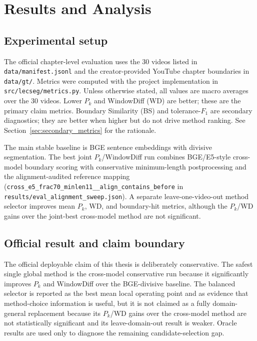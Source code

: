 \chapter{Results and Analysis}
\label{chap:results}

\section{Experimental setup}
\label{sec:setup}

The official chapter-level evaluation uses the 30 videos listed in
\texttt{data/manifest.jsonl} and the creator-provided YouTube chapter
boundaries in \texttt{data/gt/}. Metrics were computed with the project
implementation in \texttt{src/lecseg/metrics.py}. Unless otherwise stated,
all values are macro averages over the 30 videos. Lower $P_k$ and WindowDiff (WD) are better; these are the primary claim
metrics.
Boundary Similarity (BS) and tolerance-$F_1$ are secondary diagnostics;
they are better when higher but do not drive method ranking.
See Section~\ref{sec:secondary_metrics} for the rationale.

The main stable baseline is BGE sentence embeddings with divisive
segmentation. The best joint $P_k$/WindowDiff run combines BGE/E5-style
cross-model boundary scoring with conservative minimum-length postprocessing
and the alignment-audited reference mapping
(\texttt{cross\_e5\_frac70\_minlen11\_\_align\_contains\_before} in
\texttt{results/eval\_alignment\_sweep.json}). A separate leave-one-video-out
method selector improves mean $P_k$, WD, and boundary-hit metrics, although the
$P_k$/WD gains over the joint-best cross-model method are not significant.

\section{Official result and claim boundary}
\label{sec:official_claim}

The official deployable claim of this thesis is deliberately conservative. The
safest single global method is the cross-model conservative run because it
significantly improves $P_k$ and WindowDiff over the BGE-divisive baseline. The
balanced selector is reported as the best mean local operating point and as
evidence that method-choice information is useful, but it is not claimed as a
fully domain-general replacement because its $P_k$/WD gains over the
cross-model method are not statistically significant and its leave-domain-out
result is weaker. Oracle results are used only to diagnose the remaining
candidate-selection gap.

